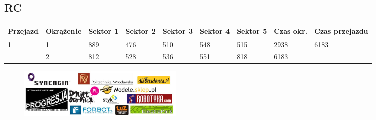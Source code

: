 \documentclass[11pt]{article}
\begin{document}
\subsection{RC}
\begin{table}[h]
\begin{tabular}{|l|l|l|l|l|l|l|l|l|}
\hline
 Przejazd        & Okrążenie & Sektor 1 & Sektor 2 & Sektor 3 & Sektor 4 & Sektor 5 & Czas okr. & Czas przejazdu    \\ \hline
\multirow{2}{*}{1}& 1 &889& 476& 510& 548& 515& 2938& \multirow{2}{*}{6183} \\ \cline{2-8}
& 2& 812& 528& 536& 551& 818& 6183& \\ \hline
\end{tabular}
\end{table}
\clearpage
\newpage
\begin{figure}
\centering
\includegraphics[width=300px, keepaspectratio=true]
{images/sponsors.jpg}
\end{figure}
\end{document}
